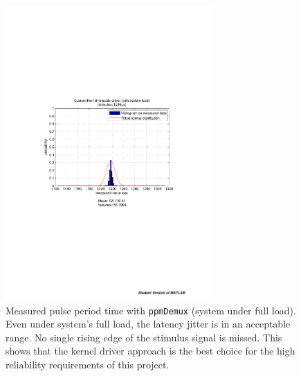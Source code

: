 \begin{figure}[H]
    \centering
    \includegraphics[width=0.71\textwidth]{fig/ch-ppm-kernel-driver/customKern_withLoad}
    \caption[Measured pulse period time with \texttt{ppmDemux} (system under full load)]{Measured pulse period time with \texttt{ppmDemux} (system under full load). Even under system's full load, the latency jitter is in an acceptable range. No single rising edge of the stimulus signal is missed. This shows that the kernel driver approach is the best choice for the high reliability requirements of this project.}
    \label{fig:remoteControl:results:customKernLoad}
\end{figure}